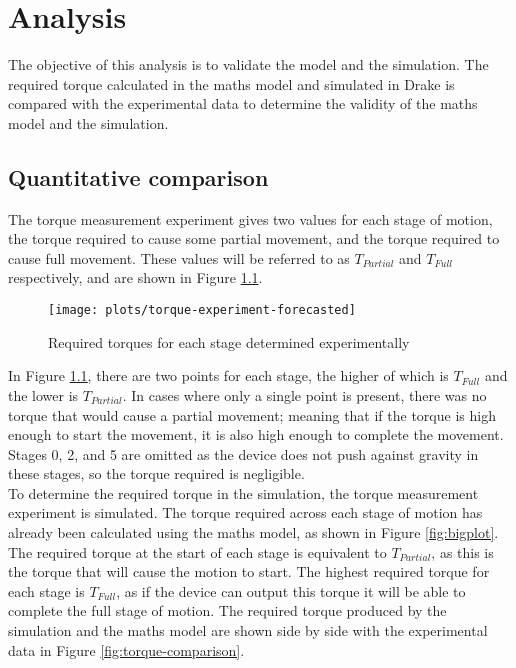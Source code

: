 \chapter{Analysis}

The objective of this analysis is to validate the model and the simulation. The required torque calculated in the maths model and simulated in Drake is compared with the experimental data to determine the validity of the maths model and the simulation.

\section{Quantitative comparison}

The torque measurement experiment gives two values for each stage of motion, the torque required to cause some partial movement, and the torque required to cause full movement. These values will be referred to as $T_{Partial}$ and $T_{Full}$ respectively, and are shown in Figure \ref{fig:torque-experiment}.\\

\begin{figure}[!h]
	\centering
	\texttt{[image: plots/torque-experiment-forecasted]}
	\caption{Required torques for each stage determined experimentally}
	\label{fig:torque-experiment}
\end{figure}

In Figure \ref{fig:torque-experiment}, there are two points for each stage, the higher of which is $T_{Full}$ and the lower is $T_{Partial}$. In cases where only a single point is present, there was no torque that would cause a partial movement; meaning that if the torque is high enough to start the movement, it is also high enough to complete the movement. Stages 0, 2, and 5 are omitted as the device does not push against gravity in these stages, so the torque required is negligible.\\

To determine the required torque in the simulation, the torque measurement experiment is simulated. The torque required across each stage of motion has already been calculated using the maths model, as shown in Figure \ref{fig:bigplot}. The required torque at the start of each stage is equivalent to $T_{Partial}$, as this is the torque that will cause the motion to start. The highest required torque for each stage is $T_{Full}$, as if the device can output this torque it will be able to complete the full stage of motion. The required torque produced by the simulation and the maths model are shown side by side with the experimental data in Figure \ref{fig:torque-comparison}.\\


